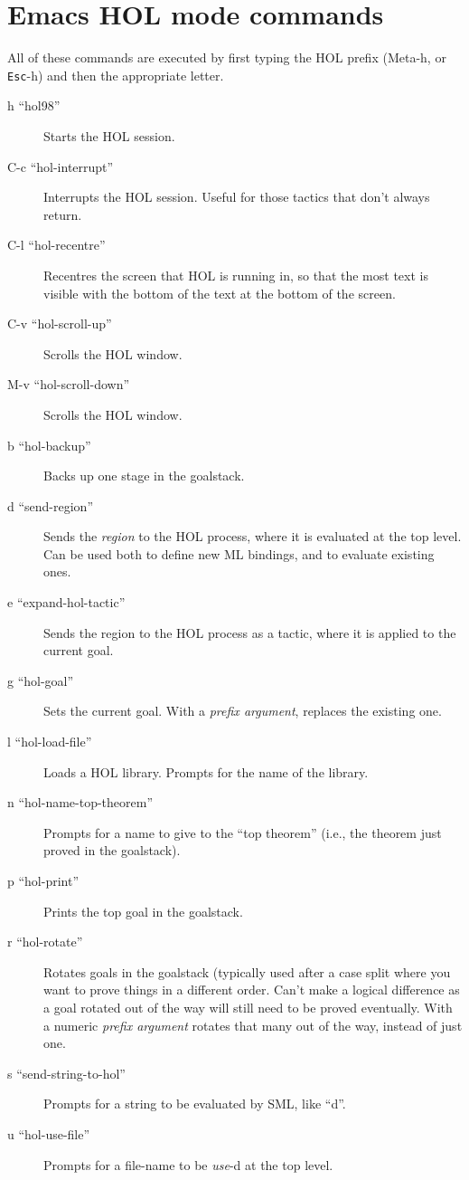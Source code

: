 \documentclass[10pt]{article}
\begin{document}
\section*{Emacs HOL mode commands}

All of these commands are executed by first typing the HOL prefix
(Meta-h, or {\tt Esc}-h) and then the appropriate letter.

\begin{description}

\item [h ``hol98''] Starts the HOL session.
\item [C-c ``hol-interrupt''] Interrupts the HOL session.  Useful for
  those tactics that don't always return.
\item [C-l ``hol-recentre''] Recentres the screen that HOL is running
  in, so that the most text is visible with the bottom of the text
  at the bottom of the screen.
\item [C-v ``hol-scroll-up''] Scrolls the HOL window.
\item [M-v ``hol-scroll-down'']Scrolls the HOL window.
\item [b   ``hol-backup''] Backs up one stage in the goalstack.
\item [d   ``send-region''] Sends the \emph{region} to the HOL
  process, where it is evaluated at the top level.  Can be used both
  to define new ML bindings, and to evaluate existing ones.
\item [e ``expand-hol-tactic''] Sends the region to the HOL process as
  a tactic, where it is applied to the current goal.
\item [g ``hol-goal''] Sets the current goal.  With a \emph{prefix
    argument}, replaces the existing one.
\item [l ``hol-load-file''] Loads a HOL library.  Prompts for the name
  of the library.
\item [n ``hol-name-top-theorem''] Prompts for a name to give to the
  ``top theorem'' (i.e., the theorem just proved in the goalstack).
\item [p ``hol-print''] Prints the top goal in the goalstack.
\item [r ``hol-rotate''] Rotates goals in the goalstack (typically
  used after a case split where you want to prove things in a
  different order.  Can't make a logical difference as a goal rotated
  out of the way will still need to be proved eventually.  With a
  numeric \emph{prefix argument} rotates that many out of the way,
  instead of just one.
\item [s ``send-string-to-hol''] Prompts for a string to be evaluated
  by SML, like ``d''.
\item [u ``hol-use-file''] Prompts for a file-name to be \emph{use}-d
  at the top level.

\end{description}
\end{document}
